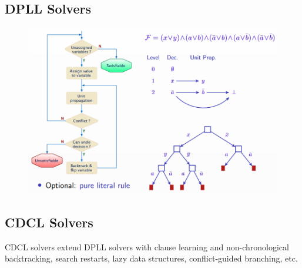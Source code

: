 \documentclass[10pt,a4paper]{report}
\begin{document}
\subsection{DPLL Solvers}
\begin{figure}[H]
    \centering
    \includegraphics[scale=0.5]{4.png}
\end{figure}
\subsection{CDCL Solvers}
CDCL solvers extend DPLL solvers with clause learning and non-chronological backtracking, search restarts, lazy data structures, conflict-guided branching, etc.
\end{document}
